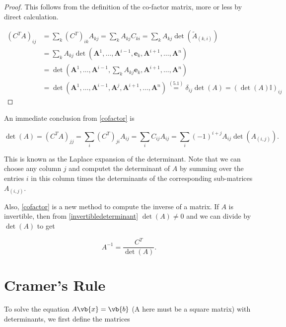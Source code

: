 \documentclass[a4paper,12pt]{report}
\begin{document}
\begin{proof}
    This follows from the definition of the co-factor matrix, more or less by direct calculation. 

    \begin{equation}
    \begin{aligned}
    (C^T A)_{ij} &= \sum_k (C^T)_{ik} A_{kj} = \sum_k A_{kj} C_{ki} = \sum_k A_{kj} \det(\tilde{A}_{(k,i)}) \\
    &= \sum_k A_{kj} \det(\mathbf{A}^1, \ldots, \mathbf{A}^{i-1}, \mathbf{e}_k, \mathbf{A}^{i+1}, \ldots, \mathbf{A}^n) \\
    &= \det\left(\mathbf{A}^1, \ldots, \mathbf{A}^{i-1}, \sum_k A_{kj} \mathbf{e}_k, \mathbf{A}^{i+1}, \ldots, \mathbf{A}^n\right) \\
    &= \det(\mathbf{A}^1, \ldots, \mathbf{A}^{i-1}, \mathbf{A}^j, \mathbf{A}^{i+1}, \ldots, \mathbf{A}^n) \overset{(5.1)}{=} \delta_{ij} \det(A) = (\det(A) \mathbb{I})_{ij}
    \end{aligned}
    \end{equation}
    

\end{proof}

An immediate conclusion from \cref{cofactor}  is

\begin{equation}
\det(A) = (C^T A)_{jj} = \sum_i (C^T)_{ji} A_{ij} = \sum_i C_{ij} A_{ij} = \sum_i (-1)^{i+j} A_{ij} \det(A_{(i,j)}).
\end{equation}

This is known as the Laplace expansion of the determinant. Note that we can choose any column \(j\) and computet the determinant of \(A\) by summing over the entries \(i\) in this column times the determinants of the corresponding sub-matrices \(A_{(i,j)} \). 

Also, \cref{cofactor} is a new method to compute the inverse of a matrix. If \(A\) is invertible, then from \cref{invertibledeterminant} \(\det (A) \neq 0\) and we can divide by \(\det (A)\) to get 

\begin{equation}
    A^{-1} = \frac{C^{T} }{\det (A)}.   
\end{equation}
\section{Cramer's Rule}

To solve the equation \(A\vb{x} = \vb{b} \) (A here must be a square matrix) with determinants, we first define the matrices 
\end{document}
